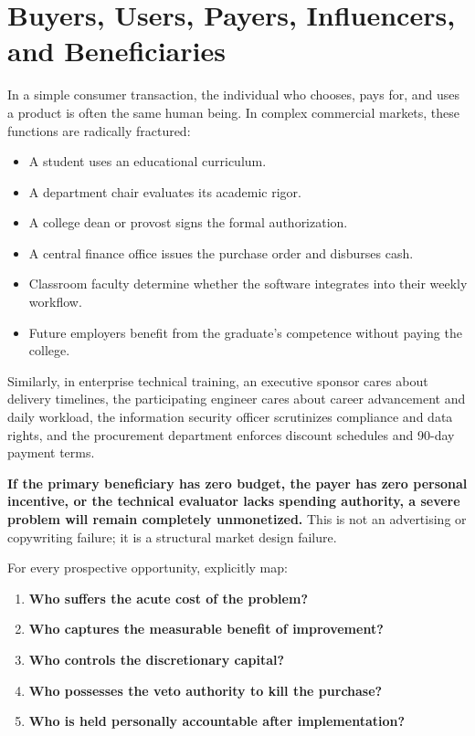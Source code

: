 \section{Buyers, Users, Payers, Influencers, and Beneficiaries}

In a simple consumer transaction, the individual who chooses, pays for, and uses a product is often the same human being. In complex commercial markets, these functions are radically fractured:

\begin{itemize}[leftmargin=12pt,itemsep=2pt,topsep=1pt,parsep=0pt]
  \item A student uses an educational curriculum.
  \item A department chair evaluates its academic rigor.
  \item A college dean or provost signs the formal authorization.
  \item A central finance office issues the purchase order and disburses cash.
  \item Classroom faculty determine whether the software integrates into their weekly workflow.
  \item Future employers benefit from the graduate's competence without paying the college.
\end{itemize}

Similarly, in enterprise technical training, an executive sponsor cares about delivery timelines, the participating engineer cares about career advancement and daily workload, the information security officer scrutinizes compliance and data rights, and the procurement department enforces discount schedules and 90-day payment terms.

\textbf{If the primary beneficiary has zero budget, the payer has zero personal incentive, or the technical evaluator lacks spending authority, a severe problem will remain completely unmonetized.} This is not an advertising or copywriting failure; it is a structural market design failure.

For every prospective opportunity, explicitly map:
\begin{enumerate}[leftmargin=12pt,itemsep=1pt,topsep=1pt,parsep=0pt]
  \item \textbf{Who suffers the acute cost of the problem?}
  \item \textbf{Who captures the measurable benefit of improvement?}
  \item \textbf{Who controls the discretionary capital?}
  \item \textbf{Who possesses the veto authority to kill the purchase?}
  \item \textbf{Who is held personally accountable after implementation?}
\end{enumerate}

